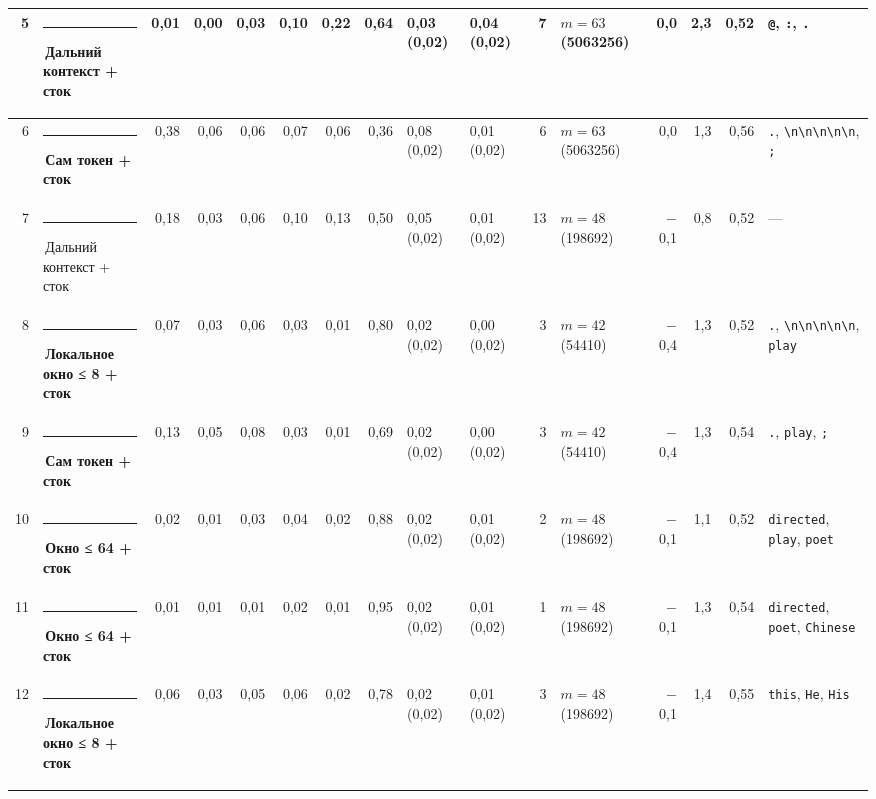 \documentclass[10pt]{article}
\begin{document}
\begin{minipage}{\linewidth}
\begin{center}
{\begin{tabular}{|r|l|r|r|r|r|r|r|l|l|r|l|r|r|r|l|}
5 & \textcolor[HTML]{C3C2B7}{\rule{0.62em}{0.62em}}\,Дальний контекст + сток & 0,01 & 0,00 & 0,03 & 0,10 & 0,22 & 0,64 & 0,03 (0,02) & 0,04 (0,02) & 7 & $m{=}63$ (5063256) & 0,0 & 2,3 & 0,52 & \texttt{\textvisiblespace{}@}, \texttt{\textvisiblespace{}:}, \texttt{\textvisiblespace{}.} \\ \hline
6 & \textcolor[HTML]{2A78D6}{\rule{0.62em}{0.62em}}\,\textbf{Сам токен + сток} & 0,38 & 0,06 & 0,06 & 0,07 & 0,06 & 0,36 & 0,08 (0,02) & 0,01 (0,02) & 6 & $m{=}63$ (5063256) & 0,0 & 1,3 & 0,56 & \texttt{\textvisiblespace{}.}, \texttt{\textvisiblespace{}\textbackslash{}n\textbackslash{}n\textbackslash{}n\textbackslash{}n\textbackslash{}n}, \texttt{\textvisiblespace{};} \\ \hline
7 & \textcolor[HTML]{C3C2B7}{\rule{0.62em}{0.62em}}\,Дальний контекст + сток & 0,18 & 0,03 & 0,06 & 0,10 & 0,13 & 0,50 & 0,05 (0,02) & 0,01 (0,02) & 13 & $m{=}48$ (198692) & $-$0,1 & 0,8 & 0,52 & — \\ \hline
8 & \textcolor[HTML]{1BAF7A}{\rule{0.62em}{0.62em}}\,\textbf{Локальное окно ≤ 8 + сток} & 0,07 & 0,03 & 0,06 & 0,03 & 0,01 & 0,80 & 0,02 (0,02) & 0,00 (0,02) & 3 & $m{=}42$ (54410) & $-$0,4 & 1,3 & 0,52 & \texttt{\textvisiblespace{}.}, \texttt{\textvisiblespace{}\textbackslash{}n\textbackslash{}n\textbackslash{}n\textbackslash{}n\textbackslash{}n}, \texttt{\textvisiblespace{}play} \\ \hline
9 & \textcolor[HTML]{2A78D6}{\rule{0.62em}{0.62em}}\,\textbf{Сам токен + сток} & 0,13 & 0,05 & 0,08 & 0,03 & 0,01 & 0,69 & 0,02 (0,02) & 0,00 (0,02) & 3 & $m{=}42$ (54410) & $-$0,4 & 1,3 & 0,54 & \texttt{\textvisiblespace{}.}, \texttt{\textvisiblespace{}play}, \texttt{\textvisiblespace{};} \\ \hline
10 & \textcolor[HTML]{EDA100}{\rule{0.62em}{0.62em}}\,\textbf{Окно ≤ 64 + сток} & 0,02 & 0,01 & 0,03 & 0,04 & 0,02 & 0,88 & 0,02 (0,02) & 0,01 (0,02) & 2 & $m{=}48$ (198692) & $-$0,1 & 1,1 & 0,52 & \texttt{\textvisiblespace{}directed}, \texttt{\textvisiblespace{}play}, \texttt{\textvisiblespace{}poet} \\ \hline
11 & \textcolor[HTML]{EDA100}{\rule{0.62em}{0.62em}}\,\textbf{Окно ≤ 64 + сток} & 0,01 & 0,01 & 0,01 & 0,02 & 0,01 & 0,95 & 0,02 (0,02) & 0,01 (0,02) & 1 & $m{=}48$ (198692) & $-$0,1 & 1,3 & 0,54 & \texttt{\textvisiblespace{}directed}, \texttt{\textvisiblespace{}poet}, \texttt{\textvisiblespace{}Chinese} \\ \hline
12 & \textcolor[HTML]{1BAF7A}{\rule{0.62em}{0.62em}}\,\textbf{Локальное окно ≤ 8 + сток} & 0,06 & 0,03 & 0,05 & 0,06 & 0,02 & 0,78 & 0,02 (0,02) & 0,01 (0,02) & 3 & $m{=}48$ (198692) & $-$0,1 & 1,4 & 0,55 & \texttt{\textvisiblespace{}this}, \texttt{\textvisiblespace{}He}, \texttt{\textvisiblespace{}His} \\ \hline

\end{tabular}}
\end{center}
\end{minipage}
\end{document}

